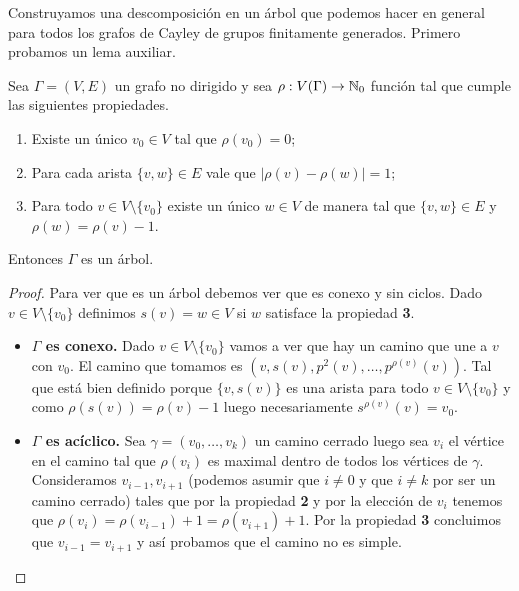\documentclass[tesis.tex]{subfiles}
\begin{document}
Construyamos una descomposición en un árbol que podemos hacer en general para todos los grafos de Cayley de grupos finitamente generados. 
Primero probamos un lema auxiliar.
\newpage
\begin{lema}
	\label{lemma:grado_arbol}
	Sea $\Gamma = (V,E)$ un grafo no dirigido y sea $\rho:V(\Gamma) \to \mathbb{N}_{0}$ función tal que cumple las siguientes propiedades.
	\begin{enumerate}
		\item Existe un único $v_{0} \in V$ tal que $\rho(v_{0}) = 0$;
		\item Para cada arista $\{v,w\} \in E$ vale que $|\rho(v) - \rho(w)|  = 1$;
		\item Para todo $v \in V \setminus \{v_{0}\}$ existe un único $w \in V$ de manera tal que $\{v,w\} \in E$ y $\rho(w) = \rho(v) - 1$.
	\end{enumerate}
	Entonces $\Gamma$ es un árbol.
\end{lema}
\begin{proof}
	Para ver que es un árbol debemos ver que es conexo y sin ciclos.
	Dado $v \in V \setminus \{v_{0}\}$ definimos $s(v) = w \in V$ si $w$ satisface la propiedad \textbf{3}.
	\begin{itemize}
		\item \textbf{$\Gamma$ es conexo.}
			Dado $v \in V \setminus \{v_{0}\}$ vamos a ver que hay un camino que une a $v$ con $v_{0}$.
			El camino que tomamos es $(v, s(v), p^{2}(v), \dots, p^{\rho(v)}(v))$.
			Tal que está bien definido porque $\{v,s(v)\}$ es una arista para todo $v \in V \setminus \{v_{0}\}$ y como $\rho(s(v)) = \rho(v) - 1$ luego necesariamente $s^{\rho(v)}(v) = v_{0}$.


		\item \textbf{$\Gamma$ es acíclico.}
			Sea $\gamma = (v_{0}, \dots, v_{k})$ un camino cerrado luego sea $v_{i}$ el vértice en el camino tal que $\rho(v_{i})$ es maximal dentro de todos los vértices de $\gamma$.
			Consideramos $v_{i-1}, v_{i+1}$ (podemos asumir que $i \neq 0$ y que $i \neq k$ por ser un camino cerrado) tales que por la propiedad \textbf{2} y por la elección de $v_{i}$ tenemos que
			$\rho(v_{i}) = \rho(v_{i-1}) + 1 = \rho(v_{i+1}) + 1$.
			Por la propiedad \textbf{3} concluimos que $v_{i-1} = v_{i+1}$ y así probamos que el camino no es simple.

	\end{itemize}
\end{proof}
\end{document}
